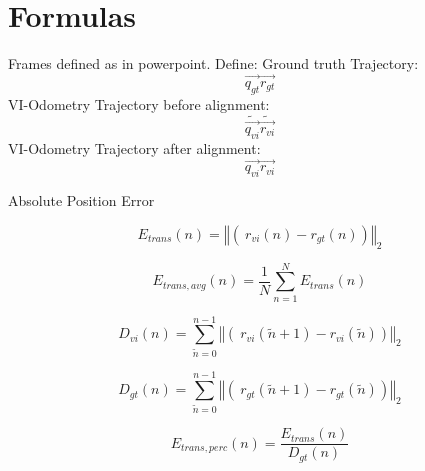 \chapter*{Formulas}

Frames defined as in powerpoint.
Define:
Ground truth Trajectory: 
\begin{equation}
       \vec{q_{gt}} \vec{r_{gt}}
\end{equation}
VI-Odometry Trajectory before alignment:
\begin{equation}
       \tilde{\vec{q_{vi}}} \tilde{\vec{r_{vi}}}
\end{equation}
VI-Odometry Trajectory after alignment:
\begin{equation}
       \vec{q_{vi}} \vec{r_{vi}}
\end{equation}

Absolute Position Error

\begin{equation}
       E_{trans} \left( n \right) = \left\Vert\left(\ r_{vi} \left( n \right) - r_{gt} \left( n \right) \right) \right\Vert_2
\end{equation}

\begin{equation}
       E_{trans, avg} \left( n \right) = \frac{1}{N} \sum_{n=1}^N E_{trans} \left( n \right)
\end{equation}

\begin{equation}
       D_{vi} \left( n \right) = \sum_{\tilde{n}=0}^{n-1} \left\Vert\left(\ r_{vi} \left( \tilde{n}+1 \right) - r_{vi} \left( \tilde{n} \right) \right) \right\Vert_2
\end{equation}

\begin{equation}
       D_{gt} \left( n \right) = \sum_{\tilde{n}=0}^{n-1} \left\Vert\left(\ r_{gt} \left( \tilde{n}+1 \right) - r_{gt} \left( \tilde{n} \right) \right) \right\Vert_2
\end{equation}

\begin{equation}
       E_{trans, perc} \left( n \right) = \frac{E_{trans} \left( n \right)}{D_{gt} \left( n \right)}
\end{equation}

